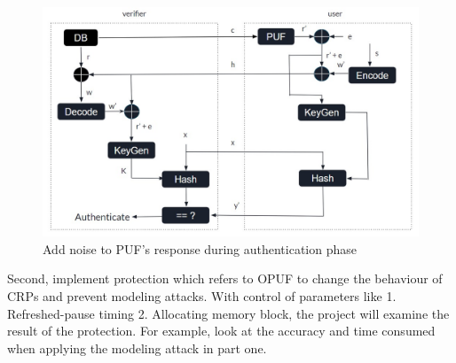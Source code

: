 \begin{figure}[htp]
    \centering
    \includegraphics[width=18cm]{figures/figure10.jpg}
    \caption{Add noise to PUF's response during authentication phase}
    \label{fig:figure10}
    \end{figure}

Second, implement protection which refers to OPUF to change the behaviour of CRPs and prevent modeling attacks. With control of parameters like 1. Refreshed-pause timing 2. Allocating memory block, 
the project will examine the result of the protection. For example, look at the accuracy and time consumed when applying the modeling attack in part one.






